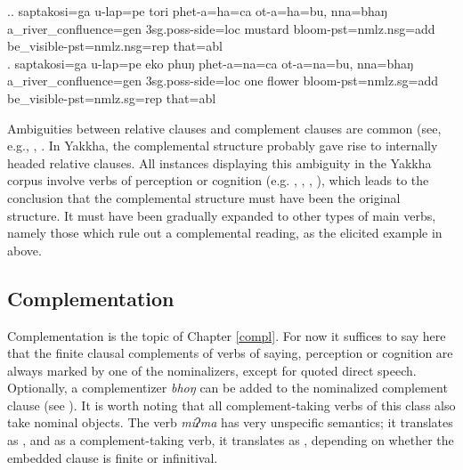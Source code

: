 \ex.\ag. saptakosi=ga u-lap=pe tori phet-a=ha=ca ot-a=ha=bu, nna=bhaŋ\\
		a\_river\_confluence{\sc =gen} {\sc 3sg.poss}-side{\sc =loc} mustard bloom{\sc [3sg]-pst=nmlz.nsg=add}  be\_visible{\sc [3sg]-pst=nmlz.nsg=rep} that{\sc =abl}	\\
	  
 \bg.	saptakosi=ga u-lap=pe eko phuŋ phet-a=na=ca ot-a=na=bu, nna=bhaŋ\\
		a\_river\_confluence{\sc =gen} {\sc 3sg.poss}-side{\sc =loc} one flower bloom{\sc [3sg]-pst=nmlz.sg=add}  be\_visible{\sc [3sg]-pst=nmlz.sg=rep} that{\sc =abl}	\\

Ambiguities between relative clauses and complement clauses are common (see, e.g., \citet[272]{Bickel1999Nominalization}, \citet[120,143]{Noonan2007Complementation}. In Yakkha, the complemental structure probably gave rise to internally headed relative clauses. All instances  displaying this ambiguity in the Yakkha corpus involve verbs of perception or cognition (e.g. , , , ), which leads to the conclusion that the complemental structure must have been the original structure. It must have been gradually expanded  to other types of main verbs, namely those which rule out a complemental reading, as the elicited example in \LLast above.




\subsection{Complementation}\label{nmlz-uni-2}

Complementation is the topic of Chapter \ref{compl}. For now it suffices to say here that the finite clausal complements of verbs of saying, perception or cognition are always marked by one of the nominalizers, except for quoted direct speech. Optionally, a complementizer \emph{bhoŋ}  can be added to the nominalized complement clause (see \Next[b]). It is worth noting that all complement-taking verbs of this class also take nominal objects. The verb \emph{miʔma} has very unspecific semantics; it translates as , and as a complement-taking verb, it translates as , depending on whether the embedded clause is finite or infinitival. 

